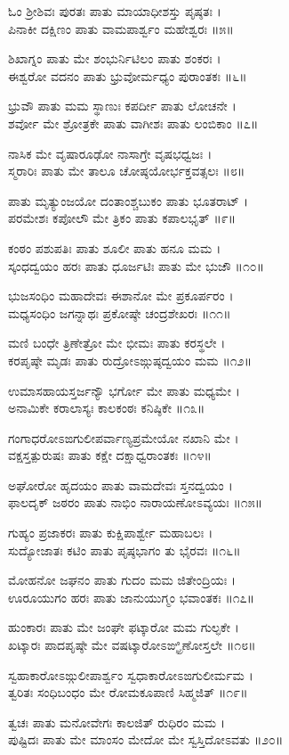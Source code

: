 ಓಂ ಶ್ರೀಶಿವಃ ಪುರತಃ ಪಾತು ಮಾಯಾಧೀಶಸ್ತು ಪೃಷ್ಠತಃ ।\\
ಪಿನಾಕೀ ದಕ್ಷಿಣಂ ಪಾತು ವಾಮಪಾರ್ಶ್ವಂ ಮಹೇಶ್ವರಃ ॥೫॥

ಶಿಖಾಗ್ನಂ ಪಾತು ಮೇ ಶಂಭುರ್ನಿಟಿಲಂ ಪಾತು ಶಂಕರಃ ।\\
ಈಶ್ವರೋ ವದನಂ ಪಾತು ಭ್ರುವೋರ್ಮಧ್ಯಂ ಪುರಾಂತಕಃ ॥೬॥

ಭ್ರುವೌ ಪಾತು ಮಮ ಸ್ಥಾಣುಃ ಕಪರ್ದೀ ಪಾತು ಲೋಚನೇ ।\\
ಶರ್ವೋ ಮೇ ಶ್ರೋತ್ರಕೇ ಪಾತು ವಾಗೀಶಃ ಪಾತು ಲಂಬಿಕಾಂ ॥೭॥

ನಾಸಿಕ ಮೇ ವೃಷಾರೂಢೋ ನಾಸಾಗ್ರೇ ವೃಷಭಧ್ವಜಃ ।\\
ಸ್ಮರಾರಿಃ ಪಾತು ಮೇ ತಾಲೂ ಚೋಷ್ಠಯೋರ್ಭಕ್ತವತ್ಸಲಃ ॥೮॥

ಪಾತು ಮೃತ್ಯುಂಜಯೋ ದಂತಾಂಶ್ಚಬುಕಂ ಪಾತು ಭೂತರಾಟ್ ।\\
ಪರಮೇಶಃ ಕಪೋಲೌ ಮೇ ತ್ರಿಕಂ ಪಾತು ಕಪಾಲಭೃತ್ ॥೯॥

ಕಂಠಂ ಪಶುಪತಿಃ ಪಾತು ಶೂಲೀ ಪಾತು ಹನೂ ಮಮ ।\\
ಸ್ಕಂಧದ್ವಯಂ ಹರಃ ಪಾತು ಧೂರ್ಜಟಿಃ ಪಾತು ಮೇ ಭುಜೌ ॥೧೦॥

ಭುಜಸಂಧಿಂ ಮಹಾದೇವಃ ಈಶಾನೋ ಮೇ ಪ್ರಕೂರ್ಪರಂ ।\\
ಮಧ್ಯಸಂಧಿಂ ಜಗನ್ನಾಥಃ ಪ್ರಕೋಷ್ಠೇ ಚಂದ್ರಶೇಖರಃ ॥೧೧॥

ಮಣಿ ಬಂಧೇ ತ್ರಿಣೇತ್ರೋ ಮೇ ಭೀಮಃ ಪಾತು ಕರಸ್ಥಲೇ ।\\
ಕರಪೃಷ್ಠೇ ಮೃಡಃ ಪಾತು ರುದ್ರೋಽಙ್ಗುಷ್ಠದ್ವಯಂ ಮಮ ॥೧೨॥

ಉಮಾಸಹಾಯಸ್ತರ್ಜನ್ಯೌ ಭರ್ಗೋ ಮೇ ಪಾತು ಮಧ್ಯಮೇ ।\\
ಅನಾಮಿಕೇ ಕರಾಲಾಸ್ಯಃ ಕಾಲಕಂಠಃ ಕನಿಷ್ಠಿಕೇ ॥೧೩॥

ಗಂಗಾಧರೋಽಙಗುಲೀಪರ್ವಾಣ್ಯಪ್ರಮೇಯೋ ನಖಾನಿ ಮೇ ।\\
ವಕ್ಷಸ್ತತ್ಪುರುಷಃ ಪಾತು ಕಕ್ಷೇ ದಕ್ಷಾಧ್ವರಾಂತಕಃ ॥೧೪॥

ಅಘೋರೋ ಹೃದಯಂ ಪಾತು ವಾಮದೇವಃ ಸ್ತನದ್ವಯಂ ।\\
ಫಾಲದೃಕ್ ಜಠರಂ ಪಾತು ನಾಭಿಂ ನಾರಾಯಣೋಽವ್ಯಯಃ ॥೧೫॥

ಗುಹ್ಯಂ ಪ್ರಜಾಕರಃ ಪಾತು ಕುಕ್ಷಿಪಾರ್ಶ್ವೇ ಮಹಾಬಲಃ ।\\
ಸುದ್ಯೋಜಾತಃ ಕಟಿಂ ಪಾತು ಪೃಷ್ಠಭಾಗಂ ತು ಭೈರವಃ ॥೧೬॥

ಮೋಹನೋ ಜಘನಂ ಪಾತು ಗುದಂ ಮಮ ಜಿತೇಂದ್ರಿಯಃ ।\\
ಊರೂಯುಗಂ ಹರಃ ಪಾತು ಜಾನುಯುಗ್ಮಂ ಭವಾಂತಕಃ ॥೧೭॥

ಹುಂಕಾರಃ ಪಾತು ಮೇ ಜಂಘೇ ಫಟ್ಕಾರೋ ಮಮ ಗುಲ್ಫಕೇ ।\\
ಖಟ್ಕಾರಃ ಪಾದಪೃಷ್ಠೇ ಮೇ ವಷಟ್ಕಾರೋಽಙ್ಘ್ರಿಣೋಸ್ತಲೇ ॥೧೮॥

ಸ್ವಹಾಕಾರೋಽಙ್ಗುಲೀಪಾರ್ಶ್ವಂ ಸ್ವಧಾಕಾರೋಽಙಗುಲೀರ್ಮಮ ।\\
ತ್ವರಿತಃ ಸಂಧಿಬಂಧಂ ಮೇ ರೋಮಕೂಪಾಣಿ ಸಿಹ್ಮಜಿತ್ ॥೧೯॥

ತ್ವಚಃ ಪಾತು ಮನೋವೇಗಃ ಕಾಲಜಿತ್ ರುಧಿರಂ ಮಮ ।\\
ಪುಷ್ಟಿದಃ ಪಾತು ಮೇ ಮಾಂಸಂ ಮೇದೋ ಮೇ ಸ್ವಸ್ತಿದೋಽವತು ॥೨೦॥

